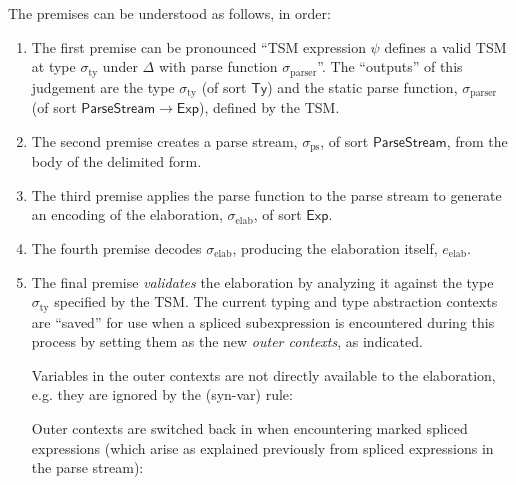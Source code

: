 The premises can be understood as follows, in order:
\begin{enumerate}
\item The first premise can be pronounced ``TSM expression $\psi$ defines a valid TSM at type $\sigma_\text{ty}$ under $\Delta$ with parse function $\sigma_\text{parser}$''.  The ``outputs'' of this judgement are the type $\sigma_\text{ty}$ (of sort $\mathsf{Ty}$) and the static parse function, $\sigma_\text{parser}$ (of sort $\mathsf{ParseStream} \rightarrow \mathsf{Exp}$), defined by the TSM.%
\item The second premise creates a parse stream, $\sigma_\text{ps}$, of sort $\mathsf{ParseStream}$, from the body of the delimited form.
\item The third premise applies the parse function to the parse stream to generate an encoding of the elaboration, $\sigma_\text{elab}$, of sort $\mathsf{Exp}$.%
\item The fourth premise decodes $\sigma_\text{elab}$, producing the elaboration itself, $e_\text{elab}$.
\item The final premise \emph{validates} the elaboration by analyzing it against the type $\sigma_\text{ty}$ specified by the TSM. The {current} typing and type abstraction contexts are ``saved'' for use when a spliced subexpression is encountered during this process by setting them as the new \emph{outer contexts}, as indicated.

Variables in the outer contexts are not directly available to the elaboration, e.g. they are ignored by the (syn-var) rule:
\begin{mathpar}
\end{mathpar}

Outer contexts are switched back in when encountering marked spliced expressions (which arise as explained previously from spliced expressions in the parse stream):
\begin{mathpar}


\end{mathpar}
\end{enumerate}

